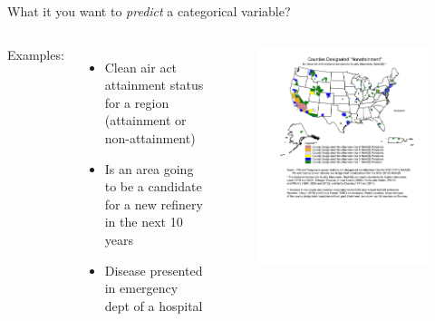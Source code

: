 \documentclass[aspectratio=169]{beamer}
\begin{document}
\begin{frame}{What it you want to \textit{predict} a categorical variable?}

\begin{columns}
Examples:
\begin{itemize}
\item Clean air act attainment status for a region (attainment or non-attainment)
\item Is an area going to be a candidate for a new refinery in the next 10 years
\item Disease presented in emergency dept of a hospital
\end{itemize}

\vspace{-5mm}
\begin{figure}
\includegraphics[width=\textwidth]{EPA_map_nonattain}
\caption*{}
\end{figure}
\end{columns}
\end{frame}
\end{document}
